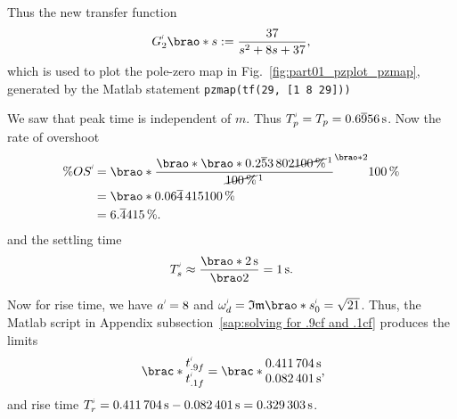 \documentclass[12pt]{article}
\newcommand*\siexpr[2][]{\SI[parse-numbers=false,#1]{#2}}%
\DeclarePairedDelimiter\brao()%
\DeclarePairedDelimiter\brac[]%
\newcommand{\setprime}[2][1]{%
    {#2}^{%
        \raisebox{1pt}{%
            \scalebox{0.5}{%
                \itshape\sffamily\uppercase%
                \expandafter{%
                    \romannumeral#1%
                }%
            }%
        }
    }%
}%
\begin{document}
\begin{enumerate}[(a)]
        Thus the new transfer function
        \begin{equation}
            \setprime{G}_2\brao*s := \frac{37}{s^2 + 8s + 37},
        \end{equation}
        which is used to plot the pole-zero map in Fig.~\ref{fig:part01_pzplot_pzmap}, generated by the Matlab statement \texttt{pzmap(tf(29, [1 8 29]))}

        We saw that peak time is independent of $m$.
        Thus $\setprime{T}_p = T_p = \siexpr{0.6\overline956}\second$. Now
        the rate of overshoot
        \begin{equation}
            \begin{aligned}
                  \%\setprime{OS}
                &{}= \brao*{\frac{\brao*{\brao*{0.2\overline53\,802}\cancel{{\SI{100}\percent}}^{\,1}}}{\cancel{\SI{100}\percent}^{\,1}}}^{\brao*{2}} \SI{100}\percent
            \\*
                &{}= \brao*{0.06\overline4\,415} \SI{100}\percent
            \\*
                &{}= \siexpr{6.\overline4415}\percent.
            \\*
            \end{aligned}
        \end{equation}
        and the settling time
        \begin{equation}
            \setprime{T}_s
            \approx \frac{\brao*{\SI2\second}}{\brao2}
            = \SI1\second.
        \end{equation}

        Now for rise time, we have $\setprime{a} = 8$ and $\setprime\omega_d = \mathfrak{Im}\brao*{\setprime{s}_0} = \sqrt{21}$.
        Thus, the Matlab script in Appendix subsection~\ref{sap:solving for .9cf and .1cf} produces the limits
        \begin{equation}
            \brac*{
                \begin{matrix}
                    \setprime{t}_{.9f} \\*
                    \setprime{t}_{.1f} \\*
                \end{matrix}
            }
            =
            \brac*{
                \begin{matrix}
                    \SI{0.411704}\second \\*
                    \SI{0.082401}\second \\*
                \end{matrix}
            }\rlap,
        \end{equation}
        and rise time $\setprime{T}_r = \SI{0.411704}\second - \SI{0.082401}\second = \SI{0.329303}\second$.


\end{enumerate}
\end{document}
